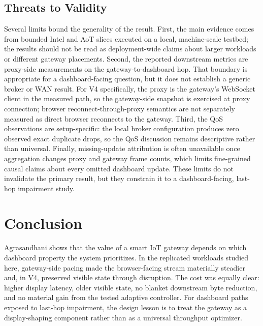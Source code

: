 \documentclass[sigconf,authorversion,nonacm]{acmart}
\begin{document}
\subsection{Threats to Validity}

Several limits bound the generality of the result. First, the main evidence comes from bounded Intel and AoT slices executed on a local, machine-scale testbed; the results should not be read as deployment-wide claims about larger workloads or different gateway placements. Second, the reported downstream metrics are proxy-side measurements on the gateway-to-dashboard hop. That boundary is appropriate for a dashboard-facing question, but it does not establish a generic broker or WAN result. For V4 specifically, the proxy is the gateway's WebSocket client in the measured path, so the gateway-side snapshot is exercised at proxy connection; browser reconnect-through-proxy semantics are not separately measured as direct browser reconnects to the gateway. Third, the QoS observations are setup-specific: the local broker configuration produces zero observed exact duplicate drops, so the QoS discussion remains descriptive rather than universal. Finally, missing-update attribution is often unavailable once aggregation changes proxy and gateway frame counts, which limits fine-grained causal claims about every omitted dashboard update. These limits do not invalidate the primary result, but they constrain it to a dashboard-facing, last-hop impairment study.

\FloatBarrier
{}
\section{Conclusion}

Agrasandhani shows that the value of a smart IoT gateway depends on which dashboard property the system prioritizes. In the replicated workloads studied here, gateway-side pacing made the browser-facing stream materially steadier and, in V4, preserved visible state through disruption. The cost was equally clear: higher display latency, older visible state, no blanket downstream byte reduction, and no material gain from the tested adaptive controller. For dashboard paths exposed to last-hop impairment, the design lesson is to treat the gateway as a display-shaping component rather than as a universal throughput optimizer.



\end{document}
